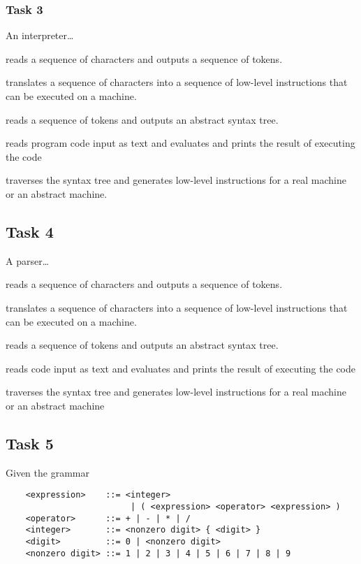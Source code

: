 \documentclass{article}
\begin{document}
\subsubsection*{Task 3}
An interpreter\ldots
\begin{deloppgaver}
    \item reads a sequence of characters and outputs a sequence of tokens.
    \item translates a sequence of characters into a sequence of low-level instructions that can be executed on a machine.
    \item reads a sequence of tokens and outputs an abstract syntax tree.
    \item reads program code input as text and evaluates and prints the result of executing the code
    \item traverses the syntax tree and generates low-level instructions for a real machine or an abstract machine.
\end{deloppgaver}

\subsection*{Task 4}
A parser\ldots
\begin{deloppgaver}
    \item reads a sequence of characters and outputs a sequence of tokens.
    \item translates a sequence of characters into a sequence of low-level instructions that can be executed on a machine.
    \item reads a sequence of tokens and outputs an abstract syntax tree.
    \item reads code input as text and evaluates and prints the result of executing the code
    \item traverses the syntax tree and generates low-level instructions for a real machine or an abstract machine
\end{deloppgaver}

\subsection*{Task 5}
Given the grammar \newline
\begin{lstlisting}
    <expression>    ::= <integer>  
                         | ( <expression> <operator> <expression> ) 
    <operator>      ::= + | - | * | / 
    <integer>       ::= <nonzero digit> { <digit> } 
    <digit>         ::= 0 | <nonzero digit>
    <nonzero digit> ::= 1 | 2 | 3 | 4 | 5 | 6 | 7 | 8 | 9
\end{lstlisting}
        
\end{document}
